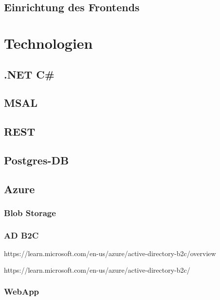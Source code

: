 \subsection{Einrichtung des Frontends}



\section{Technologien}


\subsection{.NET C\#}

\subsection{MSAL}

\subsection{REST}

\subsection{Postgres-DB}
\label{subsection:postgres_db}

\subsection{Azure}

\subsubsection{Blob Storage}
\label{subsection:azure_blob_storage}

\subsubsection{AD B2C}
\label{subsection:azure_ad_b2c}

https://learn.microsoft.com/en-us/azure/active-directory-b2c/overview

https://learn.microsoft.com/en-us/azure/active-directory-b2c/

\subsubsection{WebApp}
\label{subsection:azure_web_app}

